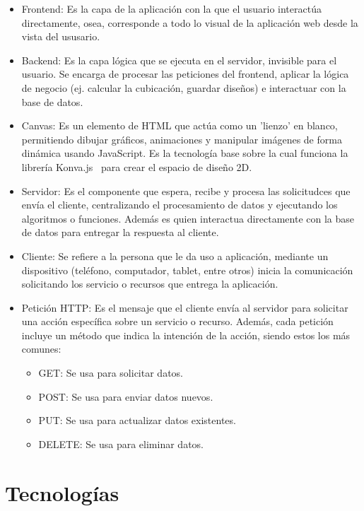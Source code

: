 ﻿\documentclass{iccmemoria}
\begin{document}
\begin{itemize}
    \item Frontend: Es la capa de la aplicación con la que el usuario interactúa directamente, osea, corresponde a todo lo visual de la aplicación web desde la vista del ususario.

\item Backend: Es la capa lógica que se ejecuta en el servidor, invisible para el usuario. Se encarga de procesar las peticiones del frontend, aplicar la lógica de negocio (ej. calcular la cubicación, guardar diseños) e interactuar con la base de datos.

\item Canvas: Es un elemento de HTML que actúa como un 'lienzo' en blanco, permitiendo dibujar gráficos, animaciones y manipular imágenes de forma dinámica usando JavaScript. Es la tecnología base sobre la cual funciona la librería Konva.js~\cite{konva} para crear el espacio de diseño 2D.

\item Servidor: Es el componente que espera, recibe y procesa las solicitudces que envía el cliente, centralizando el procesamiento de datos y ejecutando los algoritmos o funciones. Además es quien interactua directamente con la base de datos para entregar la respuesta al cliente. 

\item Cliente: Se refiere a la persona que le da uso a aplicación, mediante un dispositivo (teléfono, computador, tablet, entre otros) inicia la comunicación solicitando los servicio o recursos que entrega la aplicación.

\item Petición HTTP: Es el mensaje que el cliente envía al servidor para solicitar una acción específica sobre un servicio o recurso. Además, cada petición incluye un método que indica la intención de la acción, siendo estos los más comunes:
\begin{itemize}
    \item GET: Se usa para solicitar datos.
    \item POST: Se usa para enviar datos nuevos.
    \item PUT: Se usa para actualizar datos existentes.
    \item DELETE: Se usa para eliminar datos.
\end{itemize}
\end{itemize}

\section{Tecnologías}
\end{document}
